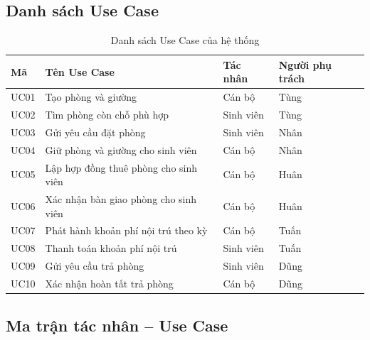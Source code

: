 \subsection{Danh sách Use Case}

\begin{table}[H]
\centering
\small
\caption{Danh sách Use Case của hệ thống}
\label{tab:ch2-3}
\begin{tabularx}{\textwidth}{|>{\raggedright\arraybackslash}p{}|>{\raggedright\arraybackslash}X|>{\raggedright\arraybackslash}p{}|>{\raggedright\arraybackslash}p{}|}
\hline
\textbf{Mã} & \textbf{Tên Use Case} & \textbf{Tác nhân} & \textbf{Người phụ trách} \\
\hline
UC01 & Tạo phòng và giường & Cán bộ & Tùng \\
\hline
UC02 & Tìm phòng còn chỗ phù hợp & Sinh viên & Tùng \\
\hline
UC03 & Gửi yêu cầu đặt phòng & Sinh viên & Nhân \\
\hline
UC04 & Giữ phòng và giường cho sinh viên & Cán bộ & Nhân \\
\hline
UC05 & Lập hợp đồng thuê phòng cho sinh viên & Cán bộ & Huân \\
\hline
UC06 & Xác nhận bàn giao phòng cho sinh viên & Cán bộ & Huân \\
\hline
UC07 & Phát hành khoản phí nội trú theo kỳ & Cán bộ & Tuấn \\
\hline
UC08 & Thanh toán khoản phí nội trú & Sinh viên & Tuấn \\
\hline
UC09 & Gửi yêu cầu trả phòng & Sinh viên & Dũng \\
\hline
UC10 & Xác nhận hoàn tất trả phòng & Cán bộ & Dũng \\
\hline
\end{tabularx}
\end{table}

\subsection{Ma trận tác nhân – Use Case}

